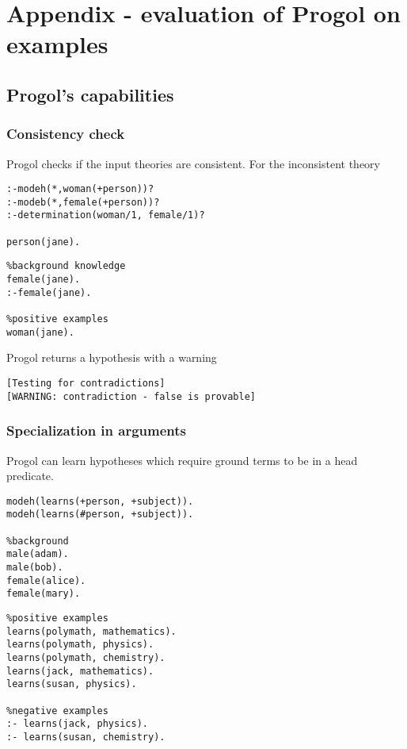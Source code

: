 \chapter{Appendix - evaluation of Progol on examples}\label{appendix_progol}

\section{Progol's capabilities}

\subsection{Consistency check}\label{progol_consistency_check}
Progol checks if the input theories are consistent. For the inconsistent theory

\begin{minipage}[t]{.50\textwidth}
\begin{lstlisting}
:-modeh(*,woman(+person))?
:-modeb(*,female(+person))?
:-determination(woman/1, female/1)?

person(jane).
\end{lstlisting}
\end{minipage}
\begin{minipage}[t]{.20\textwidth}
\begin{lstlisting}
%background knowledge
female(jane).
:-female(jane).

%positive examples
woman(jane).
\end{lstlisting}
\end{minipage}

Progol returns a hypothesis  with a warning 
\begin{lstlisting}
[Testing for contradictions]
[WARNING: contradiction - false is provable]
\end{lstlisting}

\subsection{Specialization in arguments}\label{progol_specialization_in_arguments}
Progol can learn hypotheses which require ground terms to be in a head predicate.

\begin{minipage}[t]{.50\textwidth}
\begin{lstlisting}
modeh(learns(+person, +subject)).
modeh(learns(#person, +subject)).

%background
male(adam).
male(bob).
female(alice).
female(mary).
\end{lstlisting}
\end{minipage}
\begin{minipage}[t]{.20\textwidth}
\begin{lstlisting}
%positive examples
learns(polymath, mathematics).
learns(polymath, physics).
learns(polymath, chemistry).
learns(jack, mathematics).
learns(susan, physics).

%negative examples
:- learns(jack, physics).
:- learns(susan, chemistry).
\end{lstlisting}
\end{minipage}

